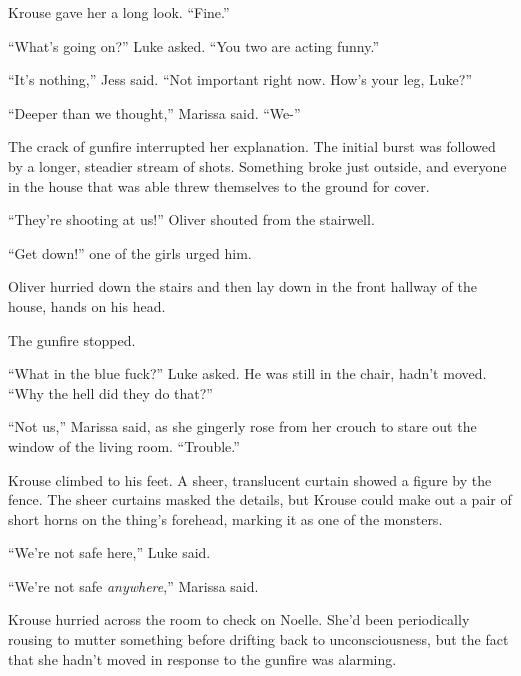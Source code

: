 Krouse gave her a long look.  ``Fine.''



``What's going on?'' Luke asked.  ``You two are acting funny.''



``It's nothing,'' Jess said.  ``Not important right now.  How's your leg, Luke?''



``Deeper than we thought,'' Marissa said.  ``We-''



The crack of gunfire interrupted her explanation.  The initial burst was followed by a longer, steadier stream of shots.  Something broke just outside, and everyone in the house that was able threw themselves to the ground for cover.



``They're shooting at us!'' Oliver shouted from the stairwell.



``Get down!'' one of the girls urged him.



Oliver hurried down the stairs and then lay down in the front hallway of the house, hands on his head.



The gunfire stopped.



``What in the blue fuck?'' Luke asked.  He was still in the chair, hadn't moved.  ``Why the hell did they do that?''



``Not us,'' Marissa said, as she gingerly rose from her crouch to stare out the window of the living room.  ``Trouble.''



Krouse climbed to his feet.  A sheer, translucent curtain showed a figure by the fence.  The sheer curtains masked the details, but Krouse could make out a pair of short horns on the thing's forehead, marking it as one of the monsters.



``We're not safe here,'' Luke said.



``We're not safe \emph{anywhere},'' Marissa said.



Krouse hurried across the room to check on Noelle.  She'd been periodically rousing to mutter something before drifting back to unconsciousness, but the fact that she hadn't moved in response to the gunfire was alarming.



